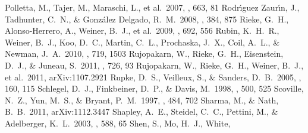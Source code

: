 \documentclass[apj]{emulateapj}
\begin{document}
\begin{thebibliography}{}
 Polletta, M., Tajer, M.,
  Maraschi, L., et al.\ 2007, \apj, 663, 81
  Rodr{\'{\i}}guez Zaur{\'{\i}}n, J., Tadhunter, C.~N., \&
  Gonz{\'a}lez Delgado, R.~M.\ 2008, \mnras, 384, 875
 Rieke, G.~H., Alonso-Herrero, A.,
  Weiner, B.~J., et al.\ 2009, \apj, 692, 556
 Rubin, K.~H.~R., Weiner, B.~J.,
  Koo, D.~C., Martin, C.~L., Prochaska, J.~X., Coil, A.~L., \& Newman,
  J.~A.\ 2010, \apj, 719, 1503
 Rujopakarn, W.,
  Rieke, G.~H., Eisenstein, D.~J., \& Juneau, S.\ 2011, \apj, 726, 93
 Rujopakarn, W., Rieke, G.~H.,
  Weiner, B.~J., et al.\ 2011, arXiv:1107.2921
 Rupke, D.~S., Veilleux, S., \&
  Sanders, D.~B.\ 2005, \apjs, 160, 115 %
 Schlegel, D.~J., Finkbeiner,
  D.~P., \& Davis, M.\ 1998, \apj, 500, 525
 Scoville, N.~Z., Yun, M.~S., \&
  Bryant, P.~M.\ 1997, \apj, 484, 702
 Sharma, M., \& Nath,
  B.~B.\ 2011, arXiv:1112.3447
 Shapley, A.~E., Steidel, C.~C.,
  Pettini, M., \& Adelberger, K.~L.\ 2003, \apj, 588, 65
 Shen, S., Mo, H.~J., White,

\end{thebibliography}
\end{document}
